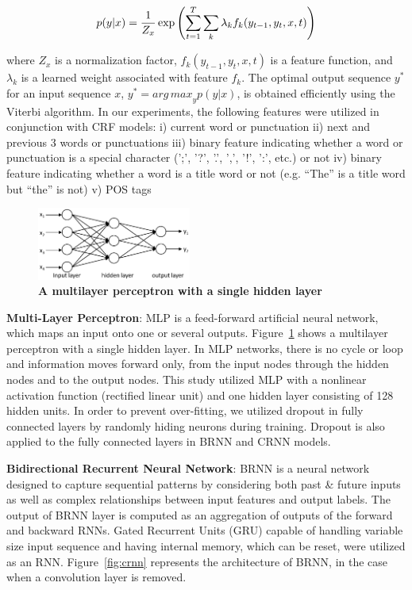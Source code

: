 \documentclass{amia}
\begin{document}
\begin{equation}
\label{Eq:crf}
p(y|x) = \frac{1}{Z_x}\exp{\left(\sum_{t=1}^{T}\sum_{k}^{}\lambda_k f_k(y_{t-1}, y_t, x, t)\right)} \\
\end{equation}

where $Z_x$ is a normalization factor, $f_k(y_{t-1}, y_t, x, t)$ is a feature function, and $\lambda_k$ is a learned weight associated with feature $f_k$. The optimal output sequence $y^*$ for an input sequence $x$, $y^* = {arg\,max}_y p(y|x)$, is obtained efficiently using the Viterbi algorithm. In our experiments, the following features were utilized in conjunction with CRF models: i) current word or punctuation ii) next and previous 3 words or punctuations iii) binary feature indicating whether a word or punctuation is a special character (';', '?', '.', ',', '!', ':', etc.) or not iv) binary feature indicating whether a word is a title word or not (e.g. ``The'' is a title word but ``the'' is not) v) POS tags   

\begin{figure}[!htb]
    \centering
    \includegraphics[width=0.45\textwidth]{figures/mlp.eps}
    \caption{\textbf{A multilayer perceptron with a single hidden layer}}
    \label{fig:mlp}
\end{figure}

\textbf{Multi-Layer Perceptron}: MLP is a feed-forward artificial neural network, which maps an input onto one or several outputs.\cite{rumelhart1986learning} Figure~\ref{fig:mlp} shows a multilayer perceptron with a single hidden layer. In MLP networks, there is no cycle or loop and information moves forward only, from the input nodes through the hidden nodes and to the output nodes. This study utilized MLP with a nonlinear activation function (rectified linear unit) and one hidden layer consisting of 128 hidden units. In order to prevent over-fitting, we utilized dropout in fully connected layers by randomly hiding neurons during training. \cite{srivastava2014dropout} Dropout is also applied to the fully connected layers in BRNN and CRNN models. 

\textbf{Bidirectional Recurrent Neural Network}: BRNN is a neural network designed to capture sequential patterns by considering both past \& future inputs as well as complex relationships between input features and output labels.\cite{schuster1997bidirectional} The output of BRNN layer is computed as an aggregation of outputs of the forward and backward RNNs. Gated Recurrent Units (GRU)\cite{chung2014empirical} capable of handling variable size input sequence and having internal memory, which can be reset, were utilized as an RNN. Figure~\ref{fig:crnn} represents the architecture of BRNN, in the case when a convolution layer is removed.   
\end{document}
